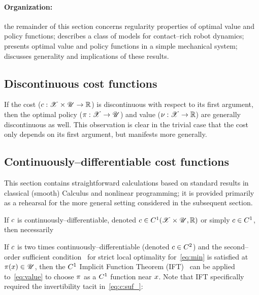 \documentclass{article}
\begin{document}
\paragraph{Organization:}
the remainder of this section concerns regularity properties of optimal value and policy functions;
 describes a class of models for contact--rich robot dynamics;
 presents optimal value and policy functions in a simple mechanical system;
 discusses generality and implications of these results.


\subsection{Discontinuous cost functions}
\label{sec:value:nc}
If the cost 
($c:\mathscr{X}\times\mathscr{U}\rightarrow\mathbb{R}$) is discontinuous with respect to its first argument, then the optimal policy 
($\pi:\mathscr{X}\rightarrow\mathscr{U}$) and value 
($\nu:\mathscr{X}\rightarrow\mathbb{R}$) are generally discontinuous as well.
This observation is clear in the trivial case that the cost only depends on its first argument, but manifests more generally.


\subsection{Continuously--differentiable cost functions}
\label{sec:value:c}

This section contains straightforward calculations based on standard results in classical (smooth) Calculus and nonlinear programming; it is provided primarily as a rehearsal for the more general setting considered in the subsequent section.

If $c$ is continuously--differentiable, denoted $c\in C^1(\mathscr{X}\times \mathscr{U},\mathbb{R})$ or simply $c\in C^1$, then necessarily~\cite[Ch.~1.1.1]{Polak1997-xd}

If $c$ is two times continuously--differentiable (denoted $c\in C^2$) and the second--order sufficient condition~\cite[Ch.~1.1.2]{Polak1997-xd} for strict local optimality for~\eqref{eq:min} is satisfied at $\pi(x)\in\mathscr{U}$,
then the $C^1$ Implicit Function Theorem (IFT)~\citep[Thm.~C.40]{Lee2012-mb} can be applied to~\eqref{eq:value} to choose $\pi$ as a $C^1$ function near $x$.
Note that IFT specifically required the invertibility tacit in~\eqref{eq:c:suf_}: 
\end{document}
